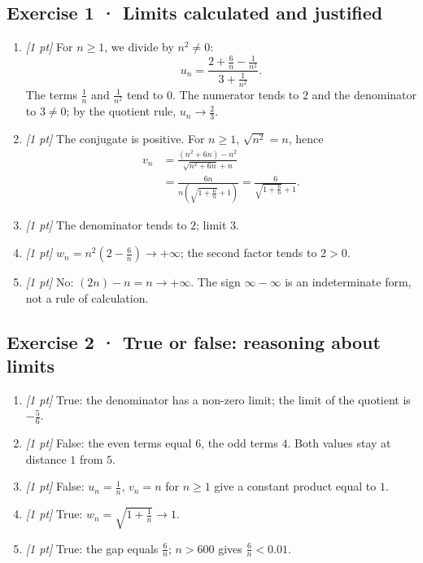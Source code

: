 \subsection*{Exercise 1 · Limits calculated and justified}\begin{enumerate}

\item \textit{[1 pt]} For $n\ge1$, we divide by $n^2\ne0$:
\[u_n=\frac{2+\frac{6}{n}-\frac{1}{n^2}}{3+\frac{1}{n^2}}.\]
The terms $\frac{1}{n}$ and $\frac{1}{n^2}$ tend to $0$. The numerator tends to $2$ and the denominator to $3\ne0$; by the quotient rule, $u_n\to\frac{2}{3}$.

\item \textit{[1 pt]} The conjugate is positive. For $n\ge1$, $\sqrt{n^2}=n$, hence
\[\begin{aligned}v_n&=\frac{(n^2+6n)-n^2}{\sqrt{n^2+6n}+n}\\&=\frac{6n}{n(\sqrt{1+\frac{6}{n}}+1)}=\frac{6}{\sqrt{1+\frac{6}{n}}+1}.\end{aligned}\]

\item \textit{[1 pt]} The denominator tends to $2$; limit $3$.

\item \textit{[1 pt]} $w_n=n^2(2-\frac{6}{n})\to+\infty$; the second factor tends to $2>0$.

\item \textit{[1 pt]} No: $(2n)-n=n\to+\infty$. The sign $\infty-\infty$ is an indeterminate form, not a rule of calculation.

\end{enumerate}

\subsection*{Exercise 2 · True or false: reasoning about limits}\begin{enumerate}

\item \textit{[1 pt]} True: the denominator has a non-zero limit; the limit of the quotient is $-\frac{5}{6}$.

\item \textit{[1 pt]} False: the even terms equal $6$, the odd terms $4$. Both values stay at distance $1$ from $5$.

\item \textit{[1 pt]} False: $u_n=\frac{1}{n}$, $v_n=n$ for $n\ge1$ give a constant product equal to $1$.

\item \textit{[1 pt]} True: $w_n=\sqrt{1+\frac{1}{n}}\to1$.

\item \textit{[1 pt]} True: the gap equals $\frac{6}{n}$; $n>600$ gives $\frac{6}{n}<0.01$.

\end{enumerate}

